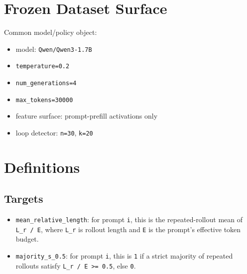 \documentclass[11pt]{article}
\begin{document}
\section*{Frozen Dataset Surface}
\begin{center}
\small
\setlength{\tabcolsep}{4pt}
\end{center}

Common model/policy object:
\begin{itemize}[leftmargin=1.5em]
\item model: \texttt{Qwen/Qwen3-1.7B}
\item \texttt{temperature=0.2}
\item \texttt{num\_generations=4}
\item \texttt{max\_tokens=30000}
\item feature surface: prompt-prefill activations only
\item loop detector: \texttt{n=30}, \texttt{k=20}
\end{itemize}

\section*{Definitions}
\subsection*{Targets}
\begin{itemize}[leftmargin=1.5em]
\item \texttt{mean\_relative\_length}: for prompt \texttt{i}, this is the repeated-rollout mean of \texttt{L\_r / E}, where \texttt{L\_r} is rollout length and \texttt{E} is the prompt's effective token budget.
\item \texttt{majority\_s\_0.5}: for prompt \texttt{i}, this is \texttt{1} if a strict majority of repeated rollouts satisfy \texttt{L\_r / E >= 0.5}, else \texttt{0}.
\end{itemize}
\end{document}
